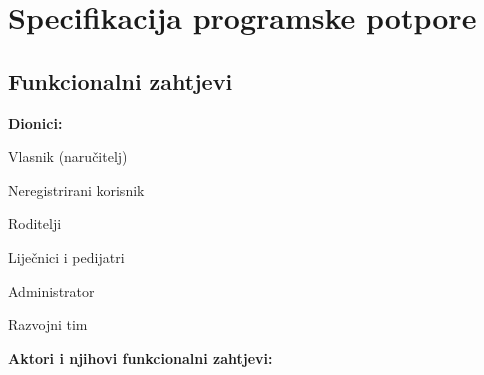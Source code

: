 \chapter{Specifikacija programske potpore}
		
	\section{Funkcionalni zahtjevi}
			\noindent \textbf{Dionici:}
			
			\begin{packed_enum}
				
				\item Vlasnik (naručitelj)
				\item Neregistrirani korisnik
				\item Roditelji				
				\item Liječnici i pedijatri
				\item Administrator
				\item Razvojni tim
				
			\end{packed_enum}
			
			\noindent \textbf{Aktori i njihovi funkcionalni zahtjevi:}
			
